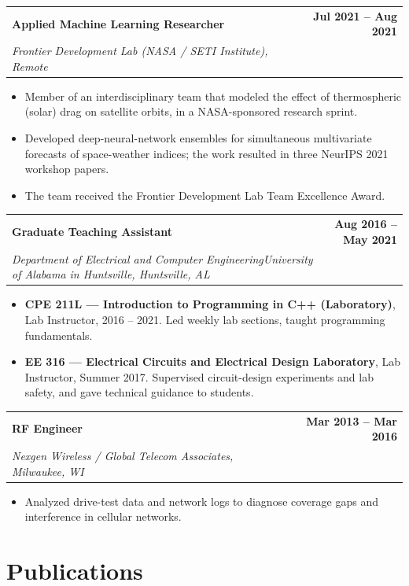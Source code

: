 \documentclass[11pt,letterpaper]{article}
\makeatletter
\newcommand{\cventry}[3]{%
  \par\needspace{5\baselineskip}\vspace{0.6ex}%
  \noindent\begin{tabularx}{\textwidth}{@{}X r@{}}
    \textbf{#1} & \textbf{#3}\\
    \textit{#2} & \\
  \end{tabularx}%
  \vspace{-0.4ex}%
}
\makeatother
\begin{document}
\cventry{Applied Machine Learning Researcher}{Frontier Development Lab (NASA / SETI Institute), Remote}{Jul 2021 -- Aug 2021}
\begin{itemize}
  \item Member of an interdisciplinary team that modeled the effect of thermospheric (solar) drag on satellite orbits, in a NASA-sponsored research sprint.
  \item Developed deep-neural-network ensembles for simultaneous multivariate forecasts of space-weather indices; the work resulted in three NeurIPS 2021 workshop papers.
  \item The team received the Frontier Development Lab Team Excellence Award.
\end{itemize}

\cventry{Graduate Teaching Assistant}{Department of Electrical and Computer Engineering\newline University of Alabama in Huntsville, Huntsville, AL}{Aug 2016 -- May 2021}
\begin{itemize}
  \item \textbf{CPE 211L --- Introduction to Programming in C++ (Laboratory)}, Lab Instructor, 2016 -- 2021. Led weekly lab sections, taught programming fundamentals.
  \item \textbf{EE 316 --- Electrical Circuits and Electrical Design Laboratory}, Lab Instructor, Summer 2017. Supervised circuit-design experiments and lab safety, and gave technical guidance to students.
\end{itemize}

\cventry{RF Engineer}{Nexgen Wireless / Global Telecom Associates, Milwaukee, WI}{Mar 2013 -- Mar 2016}
\begin{itemize}
  \item Analyzed drive-test data and network logs to diagnose coverage gaps and interference in cellular networks.
\end{itemize}

\section{Publications}
\end{document}
